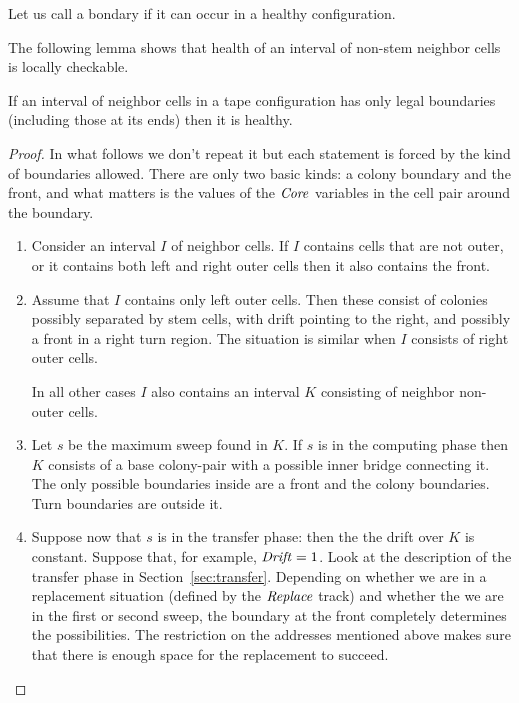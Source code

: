 \documentclass[11pt]{memoir}
\theoremstyle{definition} %
\newcommand{\fld}[1]{\ensuremath{\textit{#1\/}}}
\newcommand{\Core}{\fld{Core}}
\newcommand{\Drift}{\fld{Drift}}
\newcommand{\Replace}{\fld{Replace}}
\begin{document}
\begin{definition}\label{def:legal-boundary}
  Let us call a bondary  if it can occur in a healthy configuration.
\end{definition}

The following lemma shows that health of an interval of non-stem neighbor cells
is locally checkable.
 
\begin{lemma}
  If an interval of neighbor cells in a tape configuration
  has only legal boundaries (including those at its ends) then it is healthy.
\end{lemma}
\begin{proof}
  In what follows we don't repeat it but each statement is forced by the kind of boundaries
  allowed.
  There are only two basic kinds: a colony boundary and the front, and what matters is the values of
  the \( \Core \) variables in the cell pair around the boundary.

  \begin{enumerate}
\item Consider an interval \( I \) of neighbor cells.
  If  \( I \) contains cells that are not outer, or it contains both left and right outer cells
  then it also contains the front.

\item Assume that \( I \) contains only left outer cells.
  Then these consist of colonies possibly separated by stem cells, with drift pointing to the right,
  and possibly a front in a right turn region.
 The situation is similar when \( I \) consists of right outer cells.

In all other cases \( I \)
also contains an interval \( K \) consisting of neighbor non-outer cells.
  
\item Let \( s \) be the maximum sweep found in \( K \).
  If \( s \) is in the computing phase then \( K \) consists
  of a base colony-pair with a possible inner bridge connecting it.
  The only possible boundaries inside are a front and the colony boundaries.
  Turn boundaries are outside it.

\item Suppose now that \( s \) is in the transfer phase: then the 
  the drift over \( K \) is constant.
  Suppose that, for example, \( \Drift=1 \).
  Look at the description of the transfer phase in Section~\ref{sec:transfer}.
  Depending on whether we are in a replacement situation (defined by the \( \Replace \) track)
  and whether the we are in the first or second sweep, the boundary at the front completely
  determines the possibilities.
  The restriction on the addresses mentioned above makes sure 
  that there is enough space for the replacement to succeed.
  \end{enumerate}
\end{proof}
\end{document}
